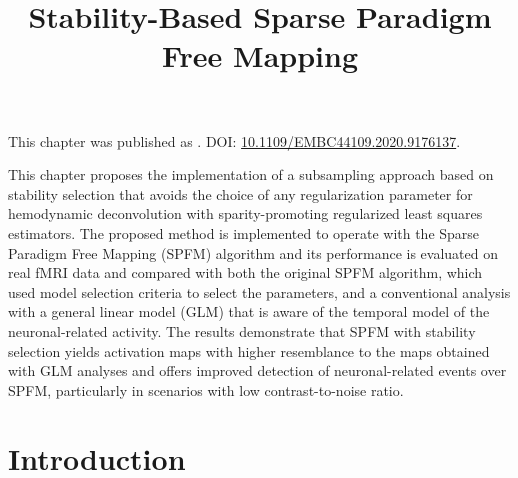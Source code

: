 \title{Stability-Based Sparse Paradigm Free Mapping}
\label{cha:stability}

\begin{framed}\noindent This chapter was published as
    . DOI:
    \url{10.1109/EMBC44109.2020.9176137}.
\end{framed}

This chapter proposes the implementation of a subsampling approach based on
stability selection that avoids the choice of any regularization parameter for
hemodynamic deconvolution with sparity-promoting regularized least squares
estimators. The proposed method is implemented to operate with the Sparse
Paradigm Free Mapping (SPFM) algorithm and its performance is evaluated on real fMRI
data and compared with both the original SPFM algorithm, which used model
selection criteria to select the parameters, and a conventional analysis with a
general linear model (GLM) that is aware of the temporal model of the
neuronal-related activity. The results demonstrate that SPFM with stability
selection yields activation maps with higher resemblance to the maps obtained
with GLM analyses and offers improved detection of neuronal-related events over
SPFM, particularly in scenarios with low contrast-to-noise ratio.

\section{Introduction}
\label{sec:stability_introduction}

